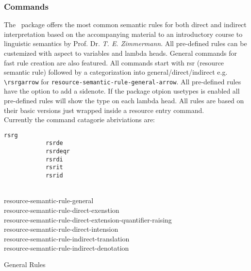 \documentclass[10pt, a4paper]{article}
\begin{document}
	\subsubsection{Commands}
	The \FraGoLi\ package offers the most common semantic rules for both direct and indirect in\-ter\-pre\-ta\-ti\-on based on the accompanying material to an introductory course to linguistic semantics by Prof. Dr. \textit{T. E. Zimmermann}. All pre-defined rules can be custemized with aspect to variables and lambda heads. General commands for fast rule creation are also featured. All commands start with rsr (resource semantic rule) followed by a categorization into general/direct/indirect e.g. \verb=\rsrgarrow= for \texttt{resource-semantic-rule-general-arrow}. All pre-defined rules have the option to add a sidenote. If the package otpion usetypes is enabled all pre-defined rules will show the type on each lambda head. All rules are based on their basic versions just wrapped inside a resource entry command.
	\\Currently the command catagorie abriviations are:
	\begin{center}
		\begin{minipage}[h][3.3cm][t]{10em}
			\begin{lstlisting}[style=B]
			rsrg
			rsrde
			rsrdeqr
			rsrdi
			rsrit
			rsrid
			\end{lstlisting}
		\end{minipage}
		\begin{minipage}[h][3.3cm][t]{30em}
			\begin{fgls}
				\ \\
				resource-semantic-rule-general\\
				resource-semantic-rule-direct-exenstion\\
				resource-semantic-rule-direct-extension-quantifier-raising\\
				resource-semantic-rule-direct-intension\\
				resource-semantic-rule-indirect-translation\\
				resource-semantic-rule-indirect-denotation
			\end{fgls}
		\end{minipage}
	\end{center}
	General Rules
\end{document}
